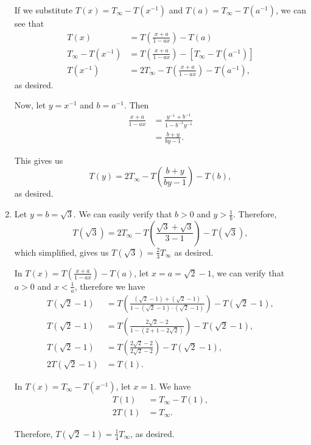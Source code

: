 \begin{enumerate}
    If we substitute \(T(x) = T_{\infty} - T(x^{-1})\) and \(T(a) = T_{\infty} - T(a^{-1})\), we can see that
    \begin{align*}
        T(x) &= T\left(\frac{x+a}{1-ax}\right) - T(a)\\
        T_{\infty} - T(x^{-1}) &= T\left(\frac{x+a}{1-ax}\right) - \left[T_{\infty} - T(a^{-1})\right]\\
        T(x^{-1}) &= 2T_{\infty} - T\left(\frac{x+a}{1-ax}\right) - T(a^{-1}),
    \end{align*}
    as desired.

    Now, let \(y = x^{-1}\) and \(b = a^{-1}\). Then
    \begin{align*}
        \frac{x + a}{1 - ax} &= \frac{y^{-1} + b^{-1}}{1 - b^{-1} y^{-1}}\\
        &= \frac{b + y}{by - 1}.
    \end{align*}

    This gives us
    \[
        T(y) = 2T_{\infty} - T\left(\frac{b + y}{by - 1}\right) - T(b),
    \]
    as desired.

    \item Let \(y = b = \sqrt{3}\). We can easily verify that \(b > 0\) and \(y > \frac{1}{b}\). Therefore,
    \[
        T(\sqrt{3}) = 2 T_{\infty} - T\left(\frac{\sqrt 3 + \sqrt 3}{3 - 1}\right) - T(\sqrt{3}),
    \]
    which simplified, gives us \(T(\sqrt{3}) = \frac{2}{3} T_{\infty}\) as desired.

    In \(T(x) = T\left(\frac{x + a}{1 - ax}\right) - T(a)\), let \(x = a = \sqrt{2} - 1\), we can verify that \(a > 0\) and \(x < \frac{1}{a}\), therefore we have
    \begin{align*}
        T(\sqrt{2} - 1) &= T\left(\frac{(\sqrt{2} - 1) + (\sqrt{2} - 1)}{1 - (\sqrt{2} - 1) \cdot (\sqrt{2} - 1)}\right) - T(\sqrt{2} - 1),\\
        T(\sqrt{2} - 1) &= T\left(\frac{2\sqrt{2} - 2}{1 - \left(2 + 1 - 2\sqrt{2}\right)}\right) - T(\sqrt{2} - 1),\\
        T(\sqrt{2} - 1) &= T\left(\frac{2\sqrt{2} - 2}{2\sqrt{2} - 2}\right) - T(\sqrt{2} - 1),\\
        2T(\sqrt{2} - 1) &= T(1).
    \end{align*}

    In \(T(x) = T_{\infty} - T(x^{-1})\), let \(x = 1\). We have
    \begin{align*}
        T(1) &= T_{\infty} - T(1),\\
        2T(1) &= T_{\infty}.
    \end{align*}

    Therefore, \(T(\sqrt{2} - 1) = \frac{1}{4} T_{\infty}\), as desired.
\end{enumerate}